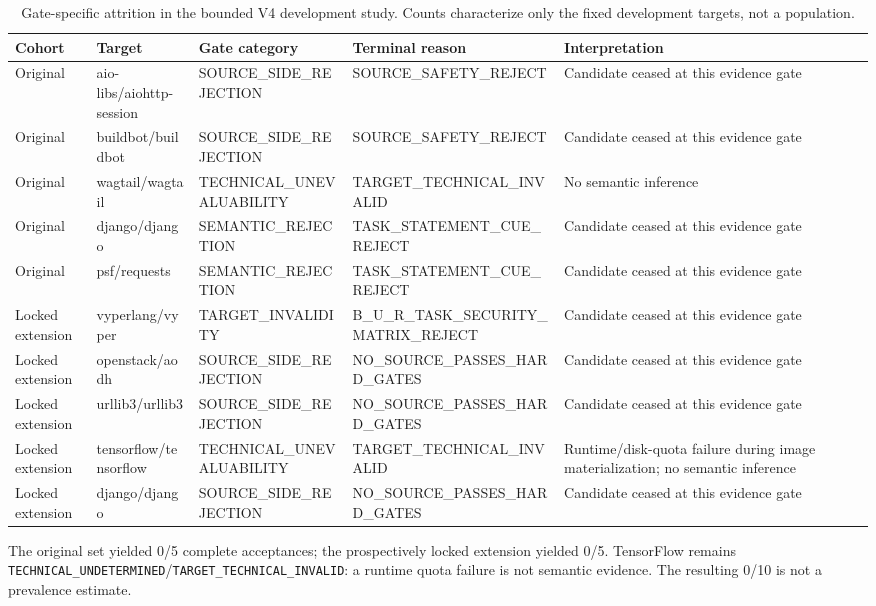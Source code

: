 \begin{table}[t]
\centering
\scriptsize
\caption{Gate-specific attrition in the bounded V4 development study. Counts characterize only the fixed development targets, not a population.}
\label{tab:v4-attrition}
\begin{tabularx}{\textwidth}{@{}llXXX@{}}
\toprule
Cohort & Target & Gate category & Terminal reason & Interpretation \\
\midrule
Original & aio-libs/aiohttp-session & SOURCE\_SIDE\_REJECTION & SOURCE\_SAFETY\_REJECT & Candidate ceased at this evidence gate \\
Original & buildbot/buildbot & SOURCE\_SIDE\_REJECTION & SOURCE\_SAFETY\_REJECT & Candidate ceased at this evidence gate \\
Original & wagtail/wagtail & TECHNICAL\_UNEVALUABILITY & TARGET\_TECHNICAL\_INVALID & No semantic inference \\
Original & django/django & SEMANTIC\_REJECTION & TASK\_STATEMENT\_CUE\_REJECT & Candidate ceased at this evidence gate \\
Original & psf/requests & SEMANTIC\_REJECTION & TASK\_STATEMENT\_CUE\_REJECT & Candidate ceased at this evidence gate \\
Locked extension & vyperlang/vyper & TARGET\_INVALIDITY & B\_U\_R\_TASK\_SECURITY\_MATRIX\_REJECT & Candidate ceased at this evidence gate \\
Locked extension & openstack/aodh & SOURCE\_SIDE\_REJECTION & NO\_SOURCE\_PASSES\_HARD\_GATES & Candidate ceased at this evidence gate \\
Locked extension & urllib3/urllib3 & SOURCE\_SIDE\_REJECTION & NO\_SOURCE\_PASSES\_HARD\_GATES & Candidate ceased at this evidence gate \\
Locked extension & tensorflow/tensorflow & TECHNICAL\_UNEVALUABILITY & TARGET\_TECHNICAL\_INVALID & Runtime/disk-quota failure during image materialization; no semantic inference \\
Locked extension & django/django & SOURCE\_SIDE\_REJECTION & NO\_SOURCE\_PASSES\_HARD\_GATES & Candidate ceased at this evidence gate \\
\bottomrule
\end{tabularx}
\vspace{2pt}
\parbox{.96\textwidth}{\footnotesize The original set yielded 0/5 complete acceptances; the prospectively locked extension yielded 0/5. TensorFlow remains \texttt{TECHNICAL\_UNDETERMINED}/\texttt{TARGET\_TECHNICAL\_INVALID}: a runtime quota failure is not semantic evidence. The resulting 0/10 is not a prevalence estimate.}
\end{table}
